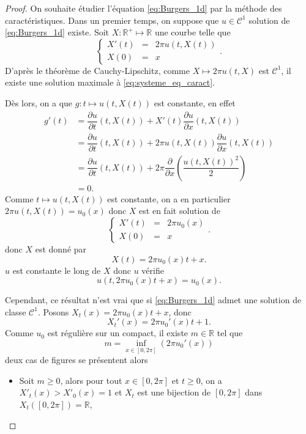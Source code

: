 \begin{proof}
On souhaite étudier l'équation \eqref{eq:Burgers_1d} par la méthode des caractéristiques. Dans un premier temps, on suppose que $u \in \mathcal{C}^1$ solution de \eqref{eq:Burgers_1d} existe. Soit $X : \mathbb{R}^+ \mapsto \mathbb{R}$ une courbe telle que
\begin{equation}
\left\lbrace
\begin{array}{rcl}
X'(t) & = & 2 \pi u (t, X(t)) \\
X(0) & = & x
\end{array}
\right. .
\label{eq:systeme_eq_caract}
\end{equation}
D'après le théorème de Cauchy-Lipschitz, comme $X \mapsto 2 \pi u (t, X)$ est $\mathcal{C}^1$, il existe une solution maximale à \eqref{eq:systeme_eq_caract}.

Dès lors, on a que $g : t \mapsto u(t,X(t))$ est constante, en effet
\begin{align*}
g'(t) & = \dfrac{\partial u}{\partial t}(t,X(t)) + X'(t) \dfrac{\partial u}{\partial x} (t,X(t)) \\
	& = \dfrac{\partial u}{\partial t}(t,X(t)) + 2 \pi u (t, X(t)) \dfrac{\partial u}{\partial x} (t,X(t)) \\
	& = \dfrac{\partial u}{\partial t}(t,X(t)) + 2 \pi  \dfrac{\partial }{\partial x} \left( \dfrac{u(t,X(t))^2}{2} \right) \\
	& = 0.
\end{align*}
Comme $t \mapsto u(t,X(t))$ est constante, on a en particulier $2 \pi u (t, X(t)) = u_0(x)$ donc $X$ est en fait solution de 
\begin{equation}
\left\lbrace
\begin{array}{rcl}
X'(t) & = & 2 \pi u_0(x) \\
X(0) & = & x
\end{array}
\right. .
\label{eq:systeme_eq_caract2}
\end{equation}
donc $X$ est donné par
\begin{equation}
X(t) = 2 \pi u_0(x) t + x.
\end{equation}
$u$ est constante le long de $X$ donc $u$ vérifie
\begin{equation}
u(t,2 \pi u_0(x)t + x)=u_0(x).
\end{equation}

Cependant, ce résultat n'est vrai que si \eqref{eq:Burgers_1d} admet une solution de classe $\mathcal{C}^1$.
Posons $X_t(x) = 2 \pi u_0(x)t + x$, donc
\begin{equation}
X_t'(x) = 2 \pi u_0'(x) t + 1.
\end{equation}
Comme $u_0$ est régulière sur un compact, il existe $m \in \mathbb{R}$ tel que
\begin{equation}
m = \inf_{x \in [0, 2 \pi]} \left( 2 \pi u_0'(x) \right)
\end{equation}
deux cas de figures se présentent alors
\begin{itemize}
\item Soit $m \geq 0$, alors pour tout $x \in [0, 2 \pi]$ et $t \geq 0$, on a $X'_t(x) > X'_0(x) = 1$ et $X_t$ est une bijection de $[0, 2 \pi]$ dans $X_t([0, 2 \pi]) = \mathbb{R}$,


\end{itemize}
\end{proof}
